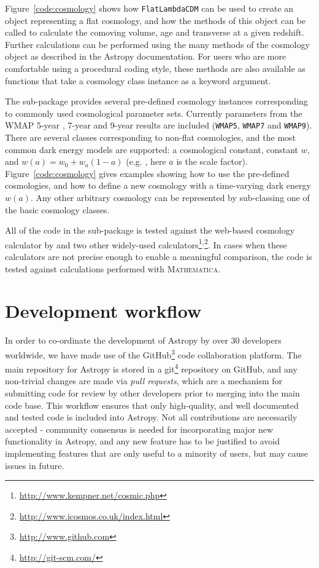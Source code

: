 \documentclass[traditabstract]{aa}
\begin{document}
Figure~\ref{code:cosmology} shows how \texttt{FlatLambdaCDM} can be
used to create an object representing a flat cosmology, and how the
methods of this object can be called to calculate the comoving volume,
age and transverse at a given redshift. Further calculations can be
performed using the many methods of the cosmology object as described
in the Astropy documentation. For users who are more comfortable using
a procedural coding style, these methods are also available as
functions that take a cosmology class instance as a keyword argument.

The sub-package provides several pre-defined cosmology instances
corresponding to commonly used cosmological parameter sets. Currently
parameters from the WMAP 5-year \citep{Komatsu09}, 7-year
\citep{Komatsu11} and 9-year results \citep{Hinshaw13} are included
(\texttt{WMAP5}, \texttt{WMAP7} and \texttt{WMAP9}).  There are
several classes corresponding to non-flat cosmologies, and the most
common dark energy models are supported: a cosmological constant,
constant $w$, and $w(a) = w_0 + w_a (1-a)$ (e.g. \citealt{Linder03},
here $a$ is the scale factor). Figure~\ref{code:cosmology} gives
examples showing how to use the pre-defined cosmologies, and how to
define a new cosmology with a time-varying dark energy $w(a)$. Any
other arbitrary cosmology can be represented by sub-classing one of
the basic cosmology classes.

All of the code in the sub-package is tested against the web-based
cosmology calculator by \citet{Wright06} and two other widely-used
calculators\footnote{\url{http://www.kempner.net/cosmic.php}}$^,$\footnote{\url{http://www.icosmos.co.uk/index.html}}.
In cases when these calculators are not precise enough to enable a
meaningful comparison, the code is tested against calculations
performed with \textsc{Mathematica}.

\section{Development workflow}

\label{sec:workflow}



In order to co-ordinate the development of Astropy by over 30 developers
worldwide, we have made use of the
GitHub\footnote{\url{http://www.github.com}} code collaboration platform. The
main repository for Astropy is stored in a
git\footnote{\url{http://git-scm.com/}} repository on GitHub, and any
non-trivial changes are made via \textit{pull requests}, which are a mechanism
for submitting code for review by other developers prior to merging into the
main code base. This workflow ensures that only high-quality, and well
documented and tested code is included into Astropy. Not all contributions are
necessarily accepted - community consensus is needed for incorporating major
new functionality in Astropy, and any new feature has to be justified to avoid
implementing features that are only useful to a minority of users, but may
cause issues in future.
\end{document}
